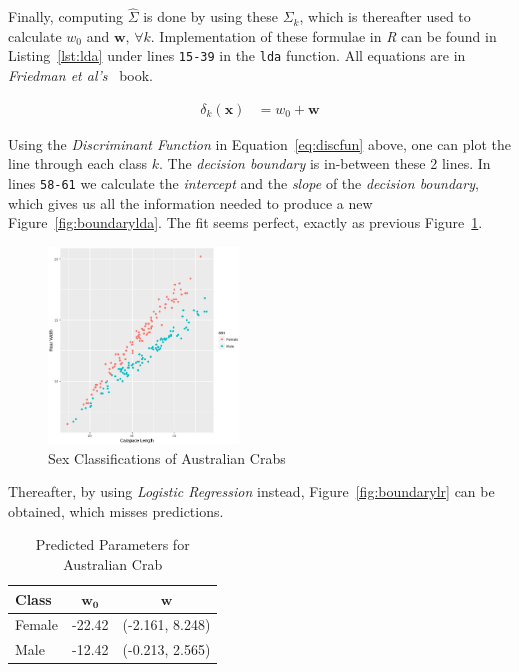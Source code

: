 \documentclass[a4paper, twocolumn]{article}
\begin{document}
        Finally, computing $\hat{\Sigma}$ is done by using these $\Sigma_k$, which is thereafter used to calculate $w_0$ and $\bm{w},\, \forall k$. Implementation of these formulae in \emph{R} can be found in Listing~\ref{lst:lda} under lines \texttt{15-39} in the \texttt{lda} function. All equations are in \emph{Friedman et al's}~\cite{friedman2009elements} book.

        \begin{equation} \label{eq:discfun}
        \begin{split}
            \delta_k(\bm{x}) &= w_0 + \bm{w}
        \end{split}
        \end{equation}

        Using the \emph{Discriminant Function} in Equation~\ref{eq:discfun} above, one can plot the line through each class $k$. The \emph{decision boundary} is in-between these 2 lines. In lines \texttt{58-61} we calculate the \emph{intercept} and the \emph{slope} of the \emph{decision boundary}, which gives us all the information needed to produce a new Figure~\ref{fig:boundarylda}. The fit seems perfect, exactly as previous Figure~\ref{fig:crabs}.

        \begin{figure}[h!]
            \centering
            \caption{Sex Classifications of Australian Crabs}
            \label{fig:crabs}
            \includegraphics[width=0.45\textwidth]{share/crabs.eps}
        \end{figure}

        \clearpage

        Thereafter, by using \emph{Logistic Regression} instead, Figure~\ref{fig:boundarylr} can be obtained, which misses predictions.

        \begin{table}[h!]
        \begin{center}
        \begin{tabular}{lcc}
            \toprule
                \textbf{Class} & $\bm{w_0}$ & $\bm{w}$ \\
            \midrule
                Female & -22.42 & (-2.161, 8.248) \\
                Male & -12.42 & (-0.213, 2.565) \\
            \bottomrule
        \end{tabular}
        \end{center}
        \caption{Predicted Parameters for Australian Crab}
        \label{table:parameters}
        \end{table}
\end{document}
